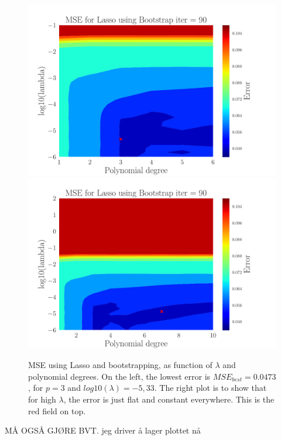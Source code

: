\documentclass[reprint,english,notitlepage,aps,nobalancelastpage,nofootinbib]{revtex4-1}  %
\begin{document}
\begin{figure}[h]
	\includegraphics[width=\linewidth]{Contour_PL_Lasso_Bootstrap90_n30_eps0.2_p1_6_lmbm1_m6.pdf}
	\endminipage\hfill
	\includegraphics[width=\linewidth]{Contour_PL_Lasso_Bootstrap90_n30_eps0.2_p1_10_lmb2_m6.pdf}
	\endminipage
	\caption{MSE using Lasso and bootstrapping, as function of $\lambda$ and polynomial degrees. On the left, the lowest error is $MSE_{best}=0.0473$, for $p=3$ and $log10(\lambda)  = -5,33$. The right plot is to show that for high $\lambda$, the error is just flat and constant everywhere. This is the red field on top. }
	\label{fig:Lasso_boot_heatmap}
\end{figure}

MÅ OGSÅ GJØRE BVT. jeg driver å lager plottet nå
\end{document}
